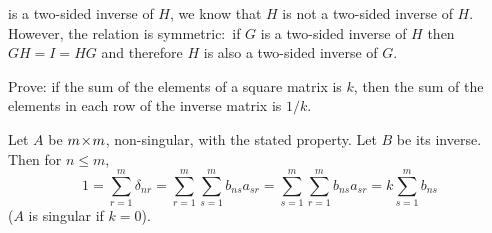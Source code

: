 \begin{exercises}
\begin{answer}
     is a two-sided inverse of \( H \), we know that \( H \) is not a two-sided
     inverse of \( H \).
     However, the relation is symmetric:~if \( G \) is a two-sided inverse of 
     \( H \) then
     \( GH=I=HG \) and therefore \( H \) is also a two-sided
     inverse of \( G \).  
   \end{answer}
  \item  
    \cite{Monthly51p614}
    Prove: if the sum of the elements of a square
    matrix is \( k \), then the sum of the elements in each row of the
    inverse matrix is \( 1/k \).
    \begin{answer}
      \answerasgiven %
      Let \( A \) be \( m \! \times \! m \), non-singular, with the stated property.
      Let \( B \) be its inverse.
      Then for \( n\leq m \),
      \begin{equation*}
        1
        =\sum_{r=1}^{m}\delta_{nr}
        =\sum_{r=1}^{m}\sum_{s=1}^{m}b_{ns}a_{sr}
        =\sum_{s=1}^{m}\sum_{r=1}^{m}b_{ns}a_{sr}
        =k\sum_{s=1}^{m}b_{ns}
      \end{equation*}
      (\( A \) is singular if \( k=0 \)).  
   \end{answer}
\end{exercises}






